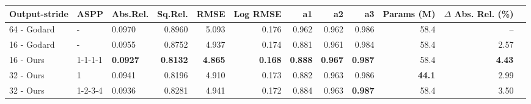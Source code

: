 \begin{tabular}{lllrrrrrrrrr}
\toprule
 Output-stride &     ASPP &  Abs.Rel. &  Sq.Rel. &   RMSE &  Log RMSE &     a1 &     a2 &     a3 &      Params (M) & $\Delta$ Abs. Rel. (\%)\\
\midrule
       64 - Godard &      - &    0.0970 &   0.8960 &  5.093 &     0.176 &  0.962 &  0.962 &  0.986 &         58.4 & -- \\
       16 - Godard & - & 0.0955 & 0.8752 &      4.937 &      0.174 &     0.881 &      0.961 &    0.984 & 58.4 & 2.57 \\
            16 - Ours &  1-1-1-1 &    \textbf{0.0927} &   \textbf{0.8132} &  \textbf{4.865} &     \textbf{0.168} &  \textbf{0.888} &  \textbf{0.967} &  \textbf{0.987} &         58.4 & \textbf{4.43} \\
            32 - Ours &   1 &    0.0941 &   0.8196 &  4.910 &     0.173 &  0.882 &  0.963 &  0.986 &         \textbf{44.1} & 2.99 \\
            32 - Ours &  1-2-3-4 &    0.0936 &   0.8281 &  4.941 &     0.172 &  0.884 &  0.963 &  \textbf{0.987} &         58.4 & 3.50\\
\bottomrule
\end{tabular}
